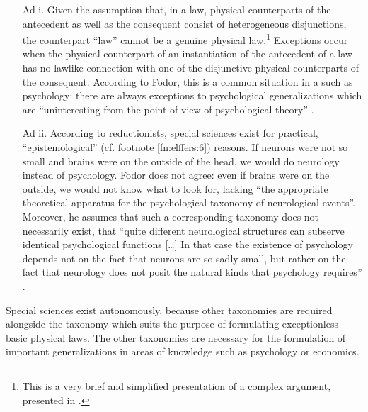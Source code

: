 \documentclass[output=paper]{langscibook}
\begin{document}
\begin{enumerate}
    \item[Ad i.] Given the assumption that, in a  law, physical counterparts of the antecedent as well as the consequent consist of heterogeneous disjunctions, the counterpart ``law'' cannot be a genuine physical law.\footnote{This is a very brief and simplified presentation of a complex argument, presented in \citet[109]{Fodor1974}.} Exceptions occur when the physical counterpart of an instantiation of the antecedent of a  law has no lawlike connection with one of the disjunctive physical counterparts of the consequent. According to Fodor, this is a common situation in a  such as psychology: there are always exceptions to psychological generalizations which are  ``uninteresting from the point of view of psychological theory'' \citep[111]{Fodor1974}.

    \item[Ad ii.] According to reductionists, special sciences exist for practical, ``epistemological'' (cf. footnote \ref{fn:elffers:6}) reasons. If neurons were not so small and brains were on the outside of the head, we would do neurology instead of psychology. Fodor does not agree: even if brains were on the outside, we would not know what to look for, lacking ``the appropriate theoretical apparatus for the psychological taxonomy of neurological events''. Moreover, he assumes that such a corresponding taxonomy does not necessarily exist, that ``quite different neurological structures can subserve identical psychological functions […] In that case the existence of psychology depends not on the fact that neurons are so sadly small, but rather on the fact that neurology does not posit the natural kinds that psychology requires'' \citep[113]{Fodor1974}.
\end{enumerate}

Special sciences exist autonomously, because other taxonomies are required alongside the taxonomy which suits the purpose of formulating exceptionless basic physical laws. The other taxonomies are necessary for the formulation of important generalizations in areas of knowledge such as psychology or economics.
\end{document}
